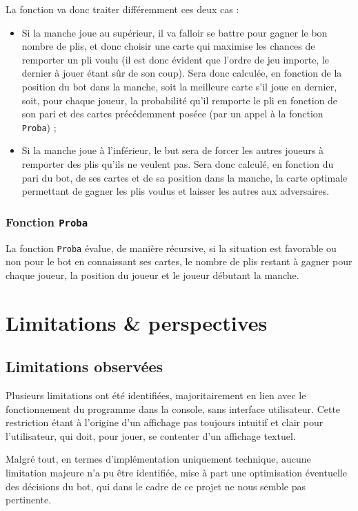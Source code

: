          La fonction va donc traiter différemment ces deux cas :
         \begin{itemize}
            \item Si la manche joue au supérieur, il va falloir se battre pour gagner le bon nombre de plis, et donc choisir une carte qui maximise les chances de remporter un pli voulu (il est donc évident que l'ordre de jeu importe, le dernier à jouer étant sûr de son coup).
            Sera donc calculée, en fonction de la position du bot dans la manche, soit la meilleure carte s'il joue en dernier, soit, pour chaque joueur, la probabilité qu'il remporte le pli en fonction de son pari et des cartes précédemment poséee (par un appel à la fonction \texttt{Proba}) ;
            \item Si la manche joue à l'inférieur, le but sera de forcer les autres joueurs à remporter des plis qu'ils ne veulent pas.
            Sera donc calculé, en fonction du pari du bot, de ses cartes et de sa position dans la manche, la carte optimale permettant de gagner les plis voulus et laisser les autres aux adversaires.
         \end{itemize}
      \subsubsection{Fonction \texttt{Proba}}
         La fonction \texttt{Proba} évalue, de manière récursive, si la situation est favorable ou non pour le bot en connaissant ses cartes, le nombre de plis restant à gagner pour chaque joueur, la position du joueur et le joueur débutant la manche.


\section{Limitations \& perspectives}\label{sec:limitations-observées-et-perspectives}
   \subsection{Limitations observées}\label{subsec:limitations-observées}
      Plusieurs limitations ont été identifiées, majoritairement en lien avec le fonctionnement du programme dans la console, sans interface utilisateur.
      Cette restriction étant à l'origine d'un affichage pas toujours intuitif et clair pour l'utilisateur, qui doit, pour jouer, se contenter d'un affichage textuel.

      Malgré tout, en termes d'implémentation uniquement technique, aucune limitation majeure n'a pu être identifiée, mise à part une optimisation éventuelle des décisions du bot, qui dans le cadre de ce projet ne nous semble pas pertinente.
   
